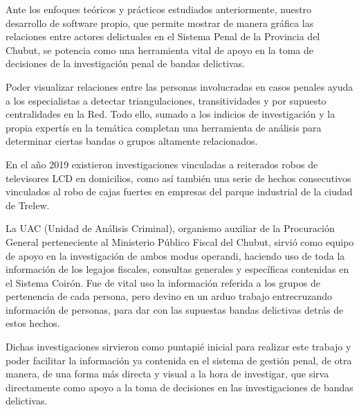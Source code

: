 Ante los enfoques teóricos y prácticos estudiados anteriormente, nuestro desarrollo de software propio, que permite mostrar de manera gráfica las relaciones entre actores delictuales en el Sistema Penal de la Provincia del Chubut, se potencia como una herramienta vital de apoyo en la toma de decisiones de la investigación penal de bandas delictivas.

Poder visualizar relaciones entre las personas involucradas en casos penales ayuda a los especialistas a detectar triangulaciones, transitividades y por supuesto centralidades en la Red. Todo ello, sumado a los indicios de investigación y la propia expertís en la temática completan una herramienta de análisis para determinar ciertas bandas o grupos altamente relacionados.

En el año 2019 existieron investigaciones vinculadas a reiterados robos de televisores LCD en domicilios, como así también una serie de hechos consecutivos vinculados al robo de cajas fuertes en empresas del parque industrial de la ciudad de Trelew.

La UAC (Unidad de Análisis Criminal), organismo auxiliar de la Procuración General perteneciente al Ministerio Público Fiscal del Chubut, sirvió como equipo de apoyo en la investigación de ambos modus operandi, haciendo uso de toda la información de los legajos fiscales, consultas generales y específicas contenidas en el Sistema Coirón. Fue de vital uso la información referida a los grupos de pertenencia de cada persona, pero devino en un arduo trabajo entrecruzando información de personas, para dar con las supuestas bandas delictivas detrás de estos hechos.

Dichas investigaciones sirvieron como puntapié inicial para realizar este trabajo y poder facilitar la información ya contenida en el sistema de gestión penal, de otra manera, de una forma más directa y visual a la hora de investigar, que sirva directamente como apoyo a la toma de decisiones en las investigaciones de bandas delictivas. 

